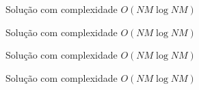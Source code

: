 \begin{frame}[fragile]{Solução com complexidade $O(NM\log NM)$}
\end{frame}

\begin{frame}[fragile]{Solução com complexidade $O(NM\log NM)$}
\end{frame}

\begin{frame}[fragile]{Solução com complexidade $O(NM\log NM)$}
\end{frame}

\begin{frame}[fragile]{Solução com complexidade $O(NM\log NM)$}
\end{frame}
